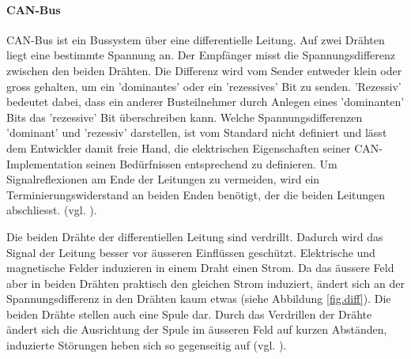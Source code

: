 \paragraph{CAN-Bus} CAN-Bus ist ein Bussystem über eine differentielle Leitung. Auf zwei Drähten liegt eine bestimmte Spannung an. Der Empfänger misst die Spannungsdifferenz zwischen den beiden Drähten. Die Differenz wird vom Sender entweder klein oder gross gehalten, um ein 'dominantes' oder ein 'rezessives' Bit zu senden. 'Rezessiv' bedeutet dabei, dass ein anderer Busteilnehmer durch Anlegen eines 'dominanten' Bits das 'rezessive' Bit überschreiben kann. Welche Spannungsdifferenzen 'dominant' und 'rezessiv' darstellen, ist vom Standard nicht definiert und lässt dem Entwickler damit freie Hand, die elektrischen Eigenschaften seiner CAN-Implementation seinen Bedürfnissen entsprechend zu definieren. Um Signalreflexionen am Ende der Leitungen zu vermeiden, wird ein Terminierungswiderstand an beiden Enden benötigt, der die beiden Leitungen abschliesst. (vgl. \cite{boschcanspec2}).

Die beiden Drähte der differentiellen Leitung sind verdrillt. Dadurch wird das Signal der Leitung besser vor äusseren Einflüssen geschützt. Elektrische und magnetische Felder induzieren in einem Draht einen Strom. Da das äussere Feld aber in beiden Drähten praktisch den gleichen Strom induziert, ändert sich an der Spannungsdifferenz in den Drähten kaum etwas (siehe Abbildung \ref{fig.diff}). Die beiden Drähte stellen auch eine Spule dar. Durch das Verdrillen der Drähte ändert sich die Ausrichtung der Spule im äusseren Feld auf kurzen Abständen, induzierte Störungen heben sich so gegenseitig auf (vgl. \cite[Kap. 2, S. 14]{muellerkt1}).

